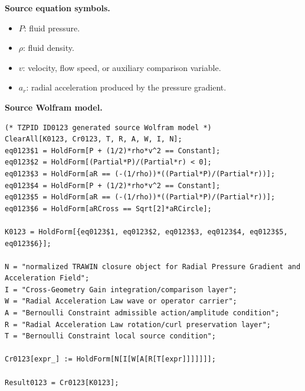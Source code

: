 \begin{minipage}[t]{0.49\linewidth}
\begingroup
\small
\raggedright
\textbf{Source equation symbols.}\par
\begin{itemize}[leftmargin=1.35em,itemsep=1pt,topsep=1pt,parsep=0pt]
    \item $P$: fluid pressure.
    \item $\rho$: fluid density.
    \item $v$: velocity, flow speed, or auxiliary comparison variable.
    \item $a_r$: radial acceleration produced by the pressure gradient.
\end{itemize}
\endgroup
\end{minipage}\hfill
\begin{minipage}[t]{0.47\linewidth}
\begingroup
\scriptsize
\raggedright
\textbf{Source Wolfram model.}\par
\begin{Verbatim}[fontsize=\tiny,breaklines=true,breakanywhere=true]
(* TZPID ID0123 generated source Wolfram model *)
ClearAll[K0123, Cr0123, T, R, A, W, I, N];
eq0123$1 = HoldForm[P + (1/2)*rho*v^2 == Constant];
eq0123$2 = HoldForm[(Partial*P)/(Partial*r) < 0];
eq0123$3 = HoldForm[aR == (-(1/rho))*((Partial*P)/(Partial*r))];
eq0123$4 = HoldForm[P + (1/2)*rho*v^2 == Constant];
eq0123$5 = HoldForm[aR == (-(1/rho))*((Partial*P)/(Partial*r))];
eq0123$6 = HoldForm[aRCross == Sqrt[2]*aRCircle];

K0123 = HoldForm[{eq0123$1, eq0123$2, eq0123$3, eq0123$4, eq0123$5, eq0123$6}];

N = "normalized TRAWIN closure object for Radial Pressure Gradient and Acceleration Field";
I = "Cross-Geometry Gain integration/comparison layer";
W = "Radial Acceleration Law wave or operator carrier";
A = "Bernoulli Constraint admissible action/amplitude condition";
R = "Radial Acceleration Law rotation/curl preservation layer";
T = "Bernoulli Constraint local source condition";

Cr0123[expr_] := HoldForm[N[I[W[A[R[T[expr]]]]]]];

Result0123 = Cr0123[K0123];
\end{Verbatim}
\endgroup
\end{minipage}

